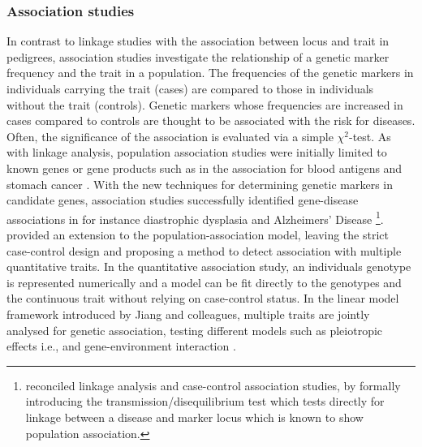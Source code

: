 \subsubsection{Association studies}
In contrast to linkage studies with the association between locus and trait in pedigrees, association studies investigate the relationship of a genetic marker frequency and the trait in a population. The frequencies of the genetic markers in individuals carrying the trait (cases) are compared to those in individuals without the trait (controls). Genetic markers whose frequencies are increased in cases compared to controls are thought to be associated with the risk for diseases. Often, the significance of the association is evaluated via a simple \(\chi ^2\)-test. As with linkage analysis, population association studies were initially limited to known genes or gene products such as in the association for blood antigens and stomach cancer \citep{Aird1953,Aird1954}. With the new techniques for determining genetic markers in candidate genes, association studies successfully identified gene-disease associations in for instance diastrophic dysplasia \citep{Hastbacka1992} and Alzheimers' Disease \citep{Strittmatter1996}\footnote{\citet{Spielman1993} reconciled linkage analysis and case-control association studies, by formally introducing the transmission/disequilibrium test which tests directly for linkage between a disease and marker locus which is known to show population association.}. \citet{Jiang1995} provided an extension to the population-association model, leaving the strict case-control design and proposing a method to detect association with multiple quantitative traits. In the quantitative association study, an individuals genotype is represented numerically and a model can be fit directly to the genotypes and the continuous trait without relying on case-control status. In the linear model framework introduced by Jiang and colleagues, multiple traits are jointly analysed for genetic association, testing different models such as pleiotropic effects i.e., and gene-environment interaction \citep{Jiang1995}. 



